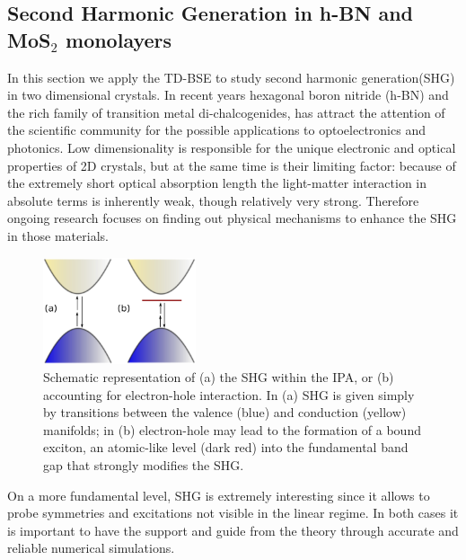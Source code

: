 \subsection{Second Harmonic Generation in h-BN and MoS$_2$ monolayers}
In this section we apply the TD-BSE to study second harmonic generation(SHG) in two dimensional crystals.\cite{attaccalite2015strong,gruning2014erratum,PhysRevB.89.081102}
In recent years hexagonal boron nitride (h-BN) and the rich family of transition metal di-chalcogenides, has attract the attention of the scientific community for the possible applications to optoelectronics and photonics.\cite{doi:10.1021/nn403159y,PhysRevB.87.201401}
Low dimensionality is responsible for the unique electronic and optical properties of 2D crystals, but at the same time is their limiting factor: because of the extremely short optical absorption length the light-matter interaction in absolute terms is inherently weak, though relatively very strong.\cite{doi:10.1021/nn403159y} Therefore ongoing research focuses on finding out physical mechanisms to enhance the SHG in those materials. 


\begin{figure}
    \vspace{-0.7cm}
\begin{center}
\includegraphics[width=0.4\textwidth]{Figures/exciton}
\caption{\footnotesize{Schematic representation of  (a) the SHG within the IPA, or (b) accounting for electron-hole interaction. In (a) SHG is given simply by transitions between the valence (blue) and conduction (yellow) manifolds; in (b) electron-hole may lead to the formation of a bound exciton, an atomic-like level (dark red) into the fundamental band gap that strongly modifies the SHG. \label{schemeshg}}}  
\end{center}
\end{figure}   

On a more fundamental level, SHG is extremely interesting since it allows to probe symmetries and excitations not visible in the linear regime\cite{doi:10.1021/nl401561r,kumar2013second}.   In both cases it is %
important to have the support and guide from the theory through accurate and reliable numerical simulations.



